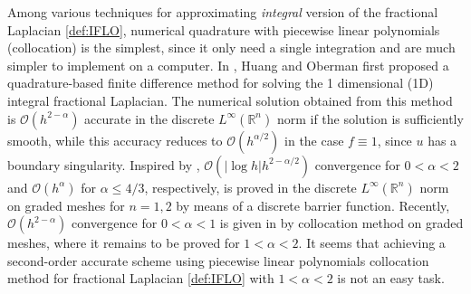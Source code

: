 \documentclass{amsart}
\theoremstyle{definition}
\theoremstyle{remark}
\numberwithin{equation}{section}
\begin{document}

 
Among various techniques for approximating {\em integral} version of the fractional Laplacian \eqref{def:IFLO}, numerical quadrature with piecewise linear polynomials (collocation) is the simplest, since it only need a single integration and are much simpler to implement on a computer.
In \cite{HuangO:14}, Huang and Oberman first proposed a quadrature-based finite difference method for solving the 1 dimensional (1D) integral fractional Laplacian.
The numerical solution obtained from this method is $\mathcal{O}\left(h^{2-\alpha}\right)$ accurate in the 
discrete $L^\infty(\mathbb{R}^{n})$ norm if the solution is  sufficiently smooth, 
while this accuracy reduces to  $\mathcal{O}\left(h^{\alpha/2}\right)$ in the case $f\equiv 1$, since $u$ has a boundary singularity.
Inspired by \cite{HuangO:14},  $\mathcal{O}\left(|\log h|h^{2-\alpha/2}\right)$ convergence  for $0<\alpha<2$ and  $\mathcal{O}\left(h^{\alpha}\right)$ for $\alpha\leq 4/3$, respectively, is proved  \cite{HW:22} in the discrete $L^{\infty}(\mathbb{R}^{n})$ norm on graded meshes for $n=1,2$ by means of a discrete barrier function. Recently,  $\mathcal{O}\left(h^{2-\alpha}\right)$ convergence for $0<\alpha< 1$ is given in \cite{Min:24} by collocation method on graded meshes, where it remains to be proved  for $1<\alpha<2$. It seems that achieving a second-order accurate scheme using piecewise linear polynomials collocation method for fractional Laplacian \eqref{def:IFLO} with $1<\alpha<2$ is not an easy task. 
\end{document}
